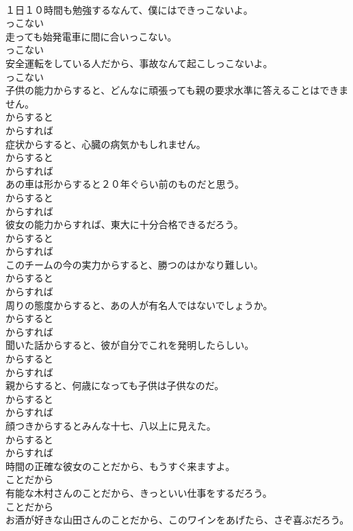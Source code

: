 \documentclass[8pt]{extreport}
\begin{document}
\begin{CJK}{UTF8}{min}
\\	１日１０時間も勉強するなんて、僕にはできっこないよ。	
\\	っこない
\\	走っても始発電車に間に合いっこない。	
\\	っこない
\\	安全運転をしている人だから、事故なんて起こしっこないよ。	
\\	っこない
\\	子供の能力からすると、どんなに頑張っても親の要求水準に答えることはできません。	
\\	からすると 
\\	からすれば
\\	症状からすると、心臓の病気かもしれません。	
\\	からすると 
\\	からすれば
\\	あの車は形からすると２０年ぐらい前のものだと思う。	
\\	からすると 
\\	からすれば
\\	彼女の能力からすれば、東大に十分合格できるだろう。	
\\	からすると 
\\	からすれば
\\	このチームの今の実力からすると、勝つのはかなり難しい。	
\\	からすると 
\\	からすれば
\\	周りの態度からすると、あの人が有名人ではないでしょうか。	
\\	からすると 
\\	からすれば
\\	聞いた話からすると、彼が自分でこれを発明したらしい。	
\\	からすると 
\\	からすれば
\\	親からすると、何歳になっても子供は子供なのだ。	
\\	からすると 
\\	からすれば
\\	顔つきからするとみんな十七、八以上に見えた。	
\\	からすると 
\\	からすれば
\\	時間の正確な彼女のことだから、もうすぐ来ますよ。	
\\	ことだから
\\	有能な木村さんのことだから、きっといい仕事をするだろう。	
\\	ことだから
\\	お酒が好きな山田さんのことだから、このワインをあげたら、さぞ喜ぶだろう。	

\end{CJK}
\end{document}
